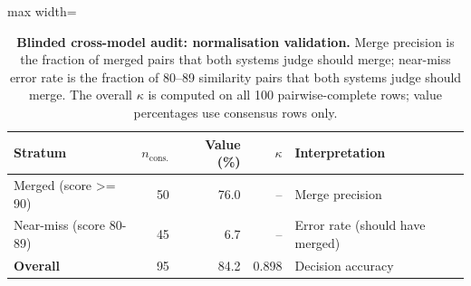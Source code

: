 \begin{table}[H]
\centering
\caption{\textbf{Blinded cross-model audit: normalisation validation.} Merge precision is the fraction of merged pairs that both systems judge should merge; near-miss error rate is the fraction of 80--89 similarity pairs that both systems judge should merge. The overall $\kappa$ is computed on all 100 pairwise-complete rows; value percentages use consensus rows only.}
\label{tab:annotation_normalization}
\begin{adjustbox}{max width=\textwidth}
\begin{tabular}{l r rr l}
\toprule
Stratum & $n_{\mathrm{cons.}}$ & Value (\%) & $\kappa$ & Interpretation \\
\midrule
Merged (score >= 90) & 50 & 76.0 & -- & Merge precision \\
Near-miss (score 80-89) & 45 & 6.7 & -- & Error rate (should have merged) \\
\textbf{Overall} & 95 & 84.2 & 0.898 & Decision accuracy \\
\bottomrule
\end{tabular}
\end{adjustbox}
\end{table}
